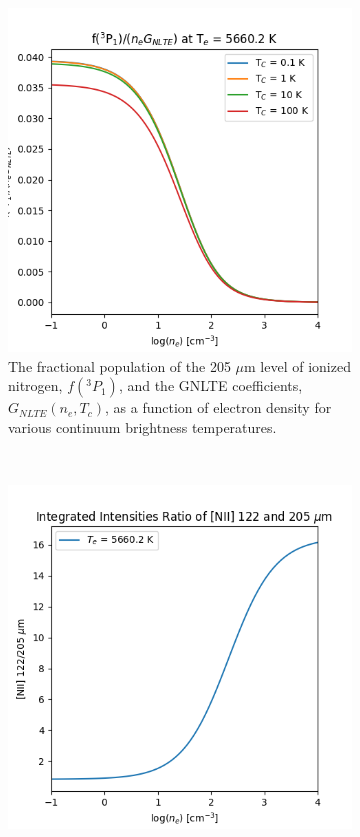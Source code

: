 \begin{figure}
    \centering
    \begin{subfigure}[t]{0.45\textwidth}
        \centering
        \includegraphics[width=\textwidth]{figs/carina/gnlte_curves.png}
        \caption{
        The fractional population of the 205 $\mu$m level of ionized nitrogen, $f(^3P_1)$, and the GNLTE coefficients, $G_{NLTE}(n_e, T_c)$, as a function of electron density for various continuum brightness temperatures.
        }
        \label{carina/fig:gnlte_curves}
    \end{subfigure}%
    ~
    \begin{subfigure}[t]{0.45\textwidth}
        \centering
        \includegraphics[width=\textwidth]{figs/carina/nii_curves.png}

\end{subfigure}
\end{figure}
